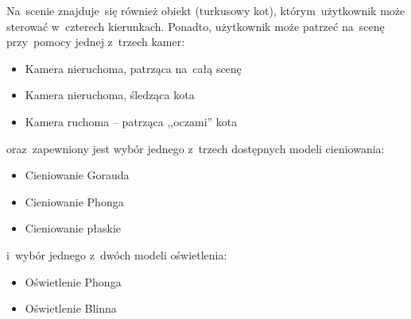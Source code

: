 \documentclass[11pt, a4paper, oneside]{scrartcl}
\begin{document}
Na~scenie znajduje~się również obiekt (turkusowy kot), którym~użytkownik może sterować w~czterech kierunkach. Ponadto, użytkownik może patrzeć na~scenę przy~pomocy jednej z~trzech kamer:
\begin{itemize}
	\item Kamera nieruchoma, patrząca na~całą scenę
	\item Kamera nieruchoma, śledząca kota
	\item Kamera ruchoma -- patrząca ,,oczami'' kota
\end{itemize}
oraz~zapewniony jest wybór jednego z~trzech dostępnych modeli cieniowania:
\begin{itemize}
	\item Cieniowanie Gorauda
	\item Cieniowanie Phonga
	\item Cieniowanie płaskie
\end{itemize}
i~wybór jednego z~dwóch modeli oświetlenia:
\begin{itemize}
	\item Oświetlenie Phonga
	\item Oświetlenie Blinna
\end{itemize}
\end{document}
